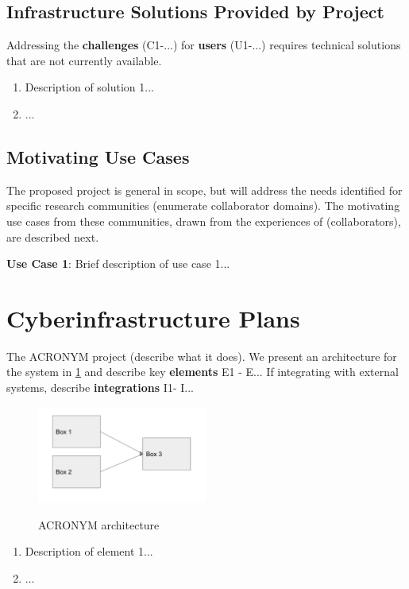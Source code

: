 \subsection{Infrastructure Solutions Provided by Project}
Addressing the {\bf challenges} (C1-...) for {\bf users} (U1-...) requires technical solutions that are not currently available. 

\begin{enumerate}[label={\bf S\arabic*.},start=1]
\item Description of solution 1...
\item ...
\end{enumerate}

\subsection{Motivating Use Cases}
The proposed project is general in scope, but will address the needs identified for specific research communities (enumerate collaborator domains). The motivating use cases from these communities, drawn from the experiences of (collaborators), are described next.

{\bf Use Case 1}: Brief description of use case 1...

\section{Cyberinfrastructure Plans}

The ACRONYM project (describe what it does). We present an architecture for the system in \ref{fig:arch} and describe key {\bf elements} E1 - E... If integrating with external systems, describe {\bf integrations} I1- I... 

\begin{figure}
\caption{ACRONYM architecture}
\centering
\includegraphics[width=0.5\textwidth]{figures/architecture.png}
\label{fig:arch}
\end{figure}

\begin{enumerate}[label={\bf E\arabic*.},start=1]
\item Description of element 1...
\item ...
\end{enumerate}


